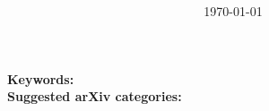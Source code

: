 \documentclass[11pt]{article}
\title{\textbf{\PaperTitle}\\[0.35em]\large \PaperSubtitle}
\author{\PaperAuthors}
\date{\today}
\begin{document}
\maketitle

\begin{abstract}
\PaperAbstract
\end{abstract}

\noindent\textbf{Keywords:} \PaperKeywords\\
\textbf{Suggested arXiv categories:} \PaperArxivCategories













\end{document}

